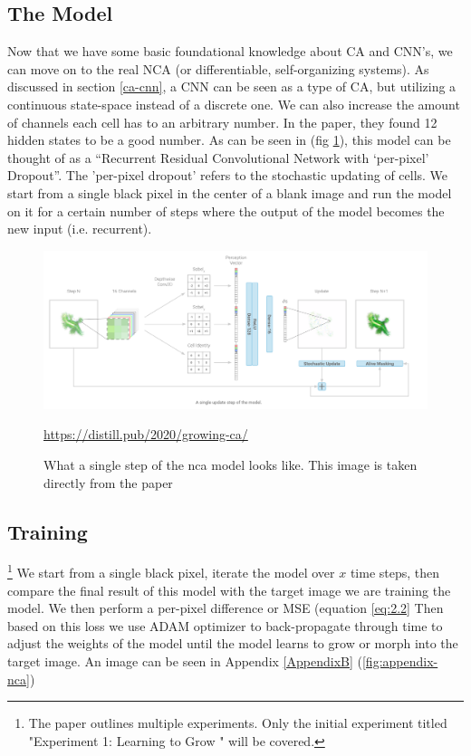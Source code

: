 \subsection{The Model}
Now that we have some basic foundational knowledge about CA and CNN's, we can move on to the real NCA (or differentiable, self-organizing systems). As discussed in section \ref{ca-cnn}, a CNN can be seen as a type of CA, but utilizing a continuous state-space instead of a discrete one. We can also increase the amount of channels each cell has to an arbitrary number. In the paper, they found 12 hidden states to be a good number. As can be seen in (fig \ref{fig:nca}), this model can be thought of as a “Recurrent Residual Convolutional Network with ‘per-pixel’ Dropout”. The 'per-pixel dropout' refers to the stochastic updating of cells. We start from a single black pixel in the center of a blank image and run the model on it for a certain number of steps where the output of the model becomes the new input (i.e. recurrent).
\begin{figure}[h]
	\includegraphics[width=1\textwidth]{../Figures/growing_nca.png}
	\centering
	\caption[NCA]{What a single step of the nca model looks like. This image is taken directly from the  paper \cite{growing_nca}} 
	\label{fig:nca}
	\url{https://distill.pub/2020/growing-ca/}
\end{figure}

\subsection{Training} \footnote{The paper outlines multiple experiments. Only the initial experiment titled "Experiment 1: Learning to Grow " will be covered.}
We start from a single black pixel, iterate the model over $x$ time steps, then compare the final result of this model with the target image we are training the model. We then perform a per-pixel difference or MSE (equation \ref{eq:2.2} Then based on this loss we use ADAM optimizer to back-propagate through time to adjust the weights of the model until the model learns to grow or morph into the target image. An image can be seen in Appendix \ref{AppendixB} (\ref{fig:appendix-nca})


